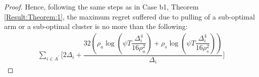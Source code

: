 \begin{proof}
Hence, following the same steps as in Case b1, Theorem \ref{Result:Theorem:1}, the maximum regret suffered due to pulling of a sub-optimal arm or a sub-optimal cluster is no more than the following:
 \begin{align*}
\sum_{i\in A^{'}}\!\bigg[ 2\Delta_{i}+\dfrac{32(\rho_{a}\log{(\psi T\dfrac{\Delta_{i}^{4}}{16\rho_{a}^{2}})} + \rho_{s}\log{(\psi T\dfrac{\Delta_{i}^{4}}{16\rho_{s}^{2}})})}{\Delta_{i}} \bigg]
 \end{align*}

 

\end{proof}
